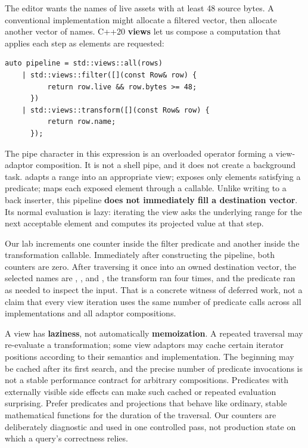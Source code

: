 \hypertarget{05-engine-i-ch006-a-view-describes-a-computation-it-does-not-necessarily-compute-the-answer-now}{}

The editor wants the names of live assets with at least 48 source bytes. A conventional implementation might allocate a filtered vector, then allocate another vector of names. C++20 \textbf{views} let us compose a computation that applies each step as elements are requested:

\begin{verbatim}
auto pipeline = std::views::all(rows)
    | std::views::filter([](const Row& row) {
          return row.live && row.bytes >= 48;
      })
    | std::views::transform([](const Row& row) {
          return row.name;
      });
\end{verbatim}

The pipe character in this expression is an overloaded operator forming a view-adaptor composition. It is not a shell pipe, and it does not create a background task.  adapts a range into an appropriate view;  exposes only elements satisfying a predicate;  maps each exposed element through a callable. Unlike  writing to a back inserter, this pipeline \textbf{does not immediately fill a destination vector}. Its normal evaluation is lazy: iterating the view asks the underlying range for the next acceptable element and computes its projected value at that step.

Our lab increments one counter inside the filter predicate and another inside the transformation callable. Immediately after constructing the pipeline, both counters are zero. After traversing it once into an owned destination vector, the selected names are , ,  and , the transform ran four times, and the predicate ran as needed to inspect the input. That is a concrete witness of deferred work, not a claim that every view iteration uses the same number of predicate calls across all implementations and all adaptor compositions.

A view has \textbf{laziness}, not automatically \textbf{memoization}. A repeated traversal may re-evaluate a transformation; some view adaptors may cache certain iterator positions according to their semantics and implementation. The  beginning may be cached after its first search, and the precise number of predicate invocations is not a stable performance contract for arbitrary compositions. Predicates with externally visible side effects can make such cached or repeated evaluation surprising. Prefer predicates and projections that behave like ordinary, stable mathematical functions for the duration of the traversal. Our counters are deliberately diagnostic and used in one controlled pass, not production state on which a query's correctness relies.

